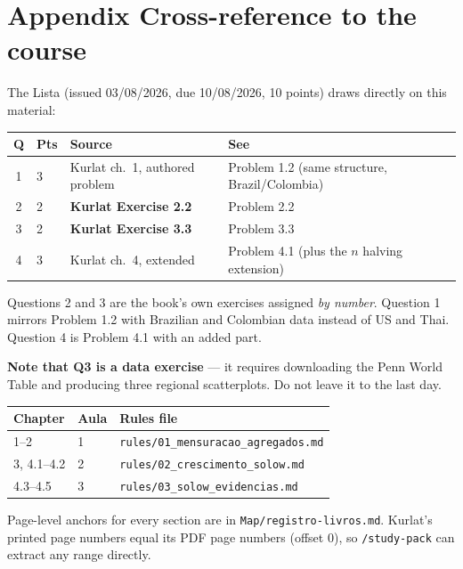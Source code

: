 \documentclass[12pt, letterpaper]{article}
\begin{document}
\section*{Appendix \quad Cross-reference to the course}

\begin{tcolorbox}[theorybox,title={Which exercises map to Lista de Exerc\'icios 1}]
The Lista (issued 03/08/2026, due 10/08/2026, 10 points) draws directly on this material:

\begin{center}
\begin{tabular}{clll}
\toprule
\textbf{Q} & \textbf{Pts} & \textbf{Source} & \textbf{See} \\
\midrule
1 & 3 & Kurlat ch.\ 1, authored problem & Problem 1.2 (same structure, Brazil/Colombia) \\
2 & 2 & \textbf{Kurlat Exercise 2.2} & Problem 2.2 \\
3 & 2 & \textbf{Kurlat Exercise 3.3} & Problem 3.3 \\
4 & 3 & Kurlat ch.\ 4, extended & Problem 4.1 (plus the $n$ halving extension) \\
\bottomrule
\end{tabular}
\end{center}

Questions 2 and 3 are the book's own exercises assigned \emph{by number}. Question 1 mirrors
Problem 1.2 with Brazilian and Colombian data instead of US and Thai. Question 4 is
Problem 4.1 with an added part.

\textbf{Note that Q3 is a data exercise} --- it requires downloading the Penn World Table and
producing three regional scatterplots. Do not leave it to the last day.
\end{tcolorbox}

\begin{tcolorbox}[theorybox,title={Course rule files}]
\begin{center}
\begin{tabular}{lll}
\toprule
\textbf{Chapter} & \textbf{Aula} & \textbf{Rules file} \\
\midrule
1--2 & 1 & \texttt{rules/01\_mensuracao\_agregados.md} \\
3, 4.1--4.2 & 2 & \texttt{rules/02\_crescimento\_solow.md} \\
4.3--4.5 & 3 & \texttt{rules/03\_solow\_evidencias.md} \\
\bottomrule
\end{tabular}
\end{center}
Page-level anchors for every section are in \texttt{Map/registro-livros.md}. Kurlat's printed
page numbers equal its PDF page numbers (offset $0$), so \texttt{/study-pack} can extract any
range directly.
\end{tcolorbox}
\end{document}
